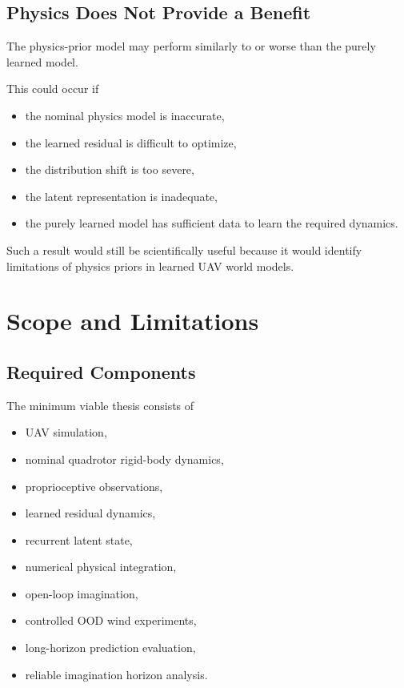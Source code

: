 \documentclass[conference]{IEEEtran}
\begin{document}
\subsection{Physics Does Not Provide a Benefit}

The physics-prior model may perform similarly to or worse than the
purely learned model.

This could occur if

\begin{itemize}
    \item the nominal physics model is inaccurate,
    \item the learned residual is difficult to optimize,
    \item the distribution shift is too severe,
    \item the latent representation is inadequate,
    \item the purely learned model has sufficient data to learn the
    required dynamics.
\end{itemize}

Such a result would still be scientifically useful because it would
identify limitations of physics priors in learned UAV world models.


\section{Scope and Limitations}


\subsection{Required Components}

The minimum viable thesis consists of

\begin{itemize}
    \item UAV simulation,
    \item nominal quadrotor rigid-body dynamics,
    \item proprioceptive observations,
    \item learned residual dynamics,
    \item recurrent latent state,
    \item numerical physical integration,
    \item open-loop imagination,
    \item controlled OOD wind experiments,
    \item long-horizon prediction evaluation,
    \item reliable imagination horizon analysis.
\end{itemize}
\end{document}
